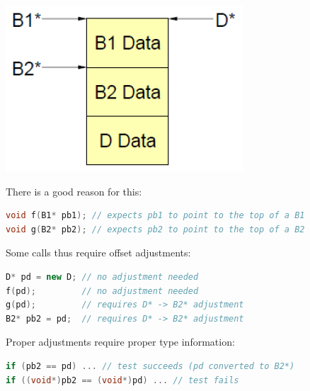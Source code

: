 \hfill
\begin{minipage}{0.2\linewidth}
\begin{center}
  \includegraphics[width=\linewidth]{images/AdvancedCPP/MI}
\end{center}
\end{minipage}%
\vspace{0.5\baselineskip}
There is a good reason for this:
\begin{lstlisting}[language=C++]
void f(B1* pb1); // expects pb1 to point to the top of a B1
void g(B2* pb2); // expects pb2 to point to the top of a B2
\end{lstlisting}
Some calls thus require offset adjustments:
\begin{lstlisting}[language=C++]
D* pd = new D; // no adjustment needed
f(pd);         // no adjustment needed
g(pd);         // requires D* -> B2* adjustment
B2* pb2 = pd;  // requires D* -> B2* adjustment
\end{lstlisting}
Proper adjustments require proper type information:
\begin{lstlisting}[language=C++]
if (pb2 == pd) ... // test succeeds (pd converted to B2*)
if ((void*)pb2 == (void*)pd) ... // test fails
\end{lstlisting}

